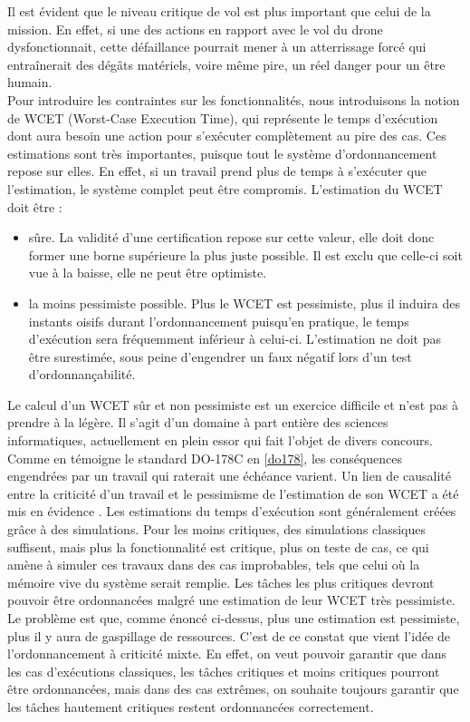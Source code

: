 \documentclass[12pt,a4paper,oneside]{book}
\theoremstyle{break}
\theoremstyle{breakplain}
\begin{document}
Il est évident que le niveau critique de vol est plus important que celui de la mission. En effet, si une des actions en rapport avec le vol du drone dysfonctionnait, cette défaillance pourrait mener à un atterrissage forcé qui entraînerait des dégâts matériels, voire même pire, un réel danger pour un être humain.\\

Pour introduire les contraintes sur les fonctionnalités, nous introduisons la notion de WCET (Worst-Case Execution Time), qui représente le temps d'exécution dont aura besoin une action pour s'exécuter complètement au pire des cas. Ces estimations sont très importantes, puisque tout le système d'ordonnancement repose sur elles. En effet, si un travail prend plus de temps à s'exécuter que l'estimation, le système complet peut être compromis. L'estimation du WCET doit être \cite{santy2012ordonnancement} :
\begin{itemize}
\item sûre. La validité d'une certification repose sur cette valeur, elle doit donc former une borne supérieure la plus juste possible. Il est exclu que celle-ci soit vue à la baisse, elle ne peut être optimiste.
\item la moins pessimiste possible. Plus le WCET est pessimiste, plus il induira des instants oisifs durant l'ordonnancement puisqu'en pratique, le temps d'exécution sera fréquemment inférieur à celui-ci. L'estimation ne doit pas être surestimée, sous peine d'engendrer un faux négatif lors d'un test d'ordonnançabilité.\\
\end{itemize}
Le calcul d'un WCET sûr et non pessimiste est un exercice difficile et n'est pas à prendre à la légère. Il s'agit d'un domaine à part entière des sciences informatiques, actuellement en plein essor qui fait l'objet de divers concours.\\

Comme en témoigne le standard DO-178C en \autoref{do178}, les conséquences engendrées par un travail qui raterait une échéance varient. Un lien de causalité entre la criticité d'un travail et le pessimisme de l'estimation de son WCET a été mis en évidence \cite{vestal2007preemptive}. Les estimations du temps d'exécution sont généralement créées grâce à des simulations. Pour les moins critiques, des simulations classiques suffisent, mais plus la fonctionnalité est critique, plus on teste de cas, ce qui amène à simuler ces travaux dans des cas improbables, tels que celui où la mémoire vive du système serait remplie. Les tâches les plus critiques devront pouvoir être ordonnancées malgré une estimation de leur WCET très pessimiste. Le problème est que, comme énoncé ci-dessus, plus une estimation est pessimiste, plus il y aura de gaspillage de ressources. C'est de ce constat que vient l'idée de l'ordonnancement à criticité mixte. En effet, on veut pouvoir garantir que dans les cas d'exécutions classiques, les tâches critiques et moins critiques pourront être ordonnancées, mais dans des cas extrêmes, on souhaite toujours garantir que les tâches hautement critiques restent ordonnancées correctement.\\
\end{document}
